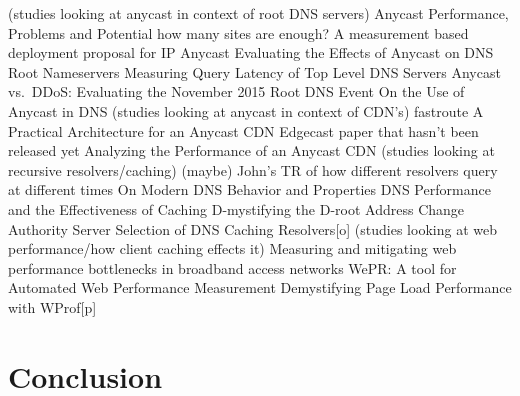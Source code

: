 \documentclass[sigconf,nonacm,10pt]{acmart}
\begin{document}
(studies looking at anycast in context of root DNS servers) Anycast
Performance, Problems and Potential how many sites are enough? A
measurement based deployment proposal for IP Anycast Evaluating the
Effects of Anycast on DNS Root Nameservers Measuring Query Latency of
Top Level DNS Servers Anycast vs.~DDoS: Evaluating the November 2015
Root DNS Event On the Use of Anycast in DNS (studies looking at anycast
in context of CDN's) fastroute A Practical Architecture for an Anycast
CDN Edgecast paper that hasn't been released yet Analyzing the
Performance of an Anycast CDN (studies looking at recursive
resolvers/caching) (maybe) John's TR of how different resolvers query at
different times On Modern DNS Behavior and Properties DNS Performance
and the Effectiveness of Caching D-mystifying the D-root Address Change
Authority Server Selection of DNS Caching Resolvers{[}o{]} (studies
looking at web performance/how client caching effects it) Measuring and
mitigating web performance bottlenecks in broadband access networks
WePR: A tool for Automated Web Performance Measurement Demystifying Page
Load Performance with WProf{[}p{]} \fi

\section{Conclusion}\label{conclusion-1}
\end{document}
